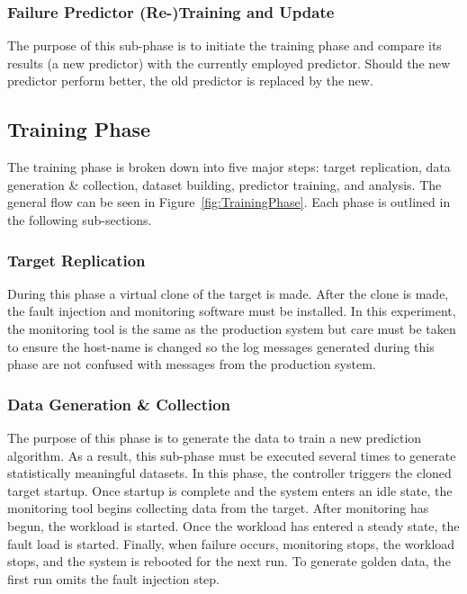 \subsubsection{Failure Predictor (Re-)Training and Update}
The purpose of this sub-phase is to initiate the training phase and compare its
results (a new predictor) with the currently employed predictor.  Should the
new predictor perform better, the old predictor is replaced by the new.

\subsection{Training Phase}
The training phase is broken down into five major steps:  target replication,
data generation \& collection, dataset building, predictor training, and
analysis.  The general flow can be seen in Figure~\ref{fig:TrainingPhase}.
Each phase is outlined in the following sub-sections.

\figTrainingPhase{4in}

\subsubsection{Target Replication}
During this phase a virtual clone of the target is made.  After the clone is
made, the fault injection and monitoring software must be installed.  In this
experiment, the monitoring tool is the same as the production system but care
must be taken to ensure the host-name is changed so the log messages generated
during this phase are not confused with messages from the production system.

\subsubsection{Data Generation \& Collection}
The purpose of this phase is to generate the data to train a new prediction
algorithm.  As a result, this sub-phase must be executed several times to
generate statistically meaningful datasets.  In this phase, the controller
triggers the cloned target startup.  Once startup is complete and the system
enters an idle state, the monitoring tool begins collecting data from the
target.  After monitoring has begun, the workload is started.  Once the
workload has entered a steady state, the fault load is started.  Finally, when
failure occurs, monitoring stops, the workload stops, and the system is
rebooted for the next run.  To generate golden data, the first run omits the
fault injection step.

